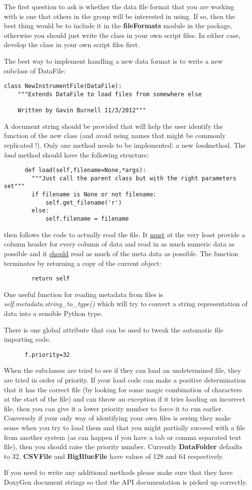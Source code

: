\documentclass[a4paper,11pt]{scrartcl}
\begin{document}
The first question to ask is whether the data file format that you are working with is one that others in the group will be interested in using. If so, then the best thing would be to include it in the \textbf{fileFormats} module in the package, otherwise you should just write the class in your own script files. In either case, develop the class in your own script files first.

The best way to implement handling a new data format is to write a new subclass of DataFile:
 \begin{lstlisting}
class NewInstrumentFile(DataFile):
    """Extends DataFile to load files from somewhere else

    Written by Gavin Burnell 11/3/2012"""
 \end{lstlisting}
 A document string should be provided that will help the user identify the function of the new class (and avoid using names that might be commonly replicated !). Only one method needs to be implemented: a new \textit{load}method. The \textit{load} method should have the following structure:
\begin{lstlisting}
      def load(self,filename=None,*args):
        """Just call the parent class but with the right parameters set"""
        if filename is None or not filename:
            self.get_filename('r')
        else:
            self.filename = filename
\end{lstlisting}
then follows the code to actually read the file. It \underline{must} at the very least provide a column header for every column of data and read in as much numeric data as possible and it \underline{should} read as much of the meta data as possible. The function terminates by returning a copy of the current object:
\begin{lstlisting}
        return self
\end{lstlisting}
One useful function for reading metadata from files is \textit{self.metadata.string\_to\_type()} which will try to convert a string representation of data into a sensible Python type.

There is one global attribute that can be used to tweak the automatic file importing code.
\begin{lstlisting}
      f.priority=32
\end{lstlisting}

When the subclasses are tried to see if they can load an undetermined file, they are tried in order of priority. If your load code can make a positive determination that it has the correct file (\eg by looking for some magic combination of characters at the start of the file) and can throw an exception if it tries loading an incorrect file, then you can give it a lower priority number to force it to run earlier. Conversely if your only way of identifying your own files is seeing they make sense when you try to load them and that you might partially succeed with a file from another system (as can happen if you have a tab or comma separated text file), then you should raise the priority number. Currently \textbf{DataFolder} defaults to 32, \textbf{CSVFile} and \textbf{BigBlueFile} have values of 128 and 64 respectively.

If you need to write any additional methods please make sure that they have DoxyGen document strings so that the API documentation is picked up correctly.
\end{document}
